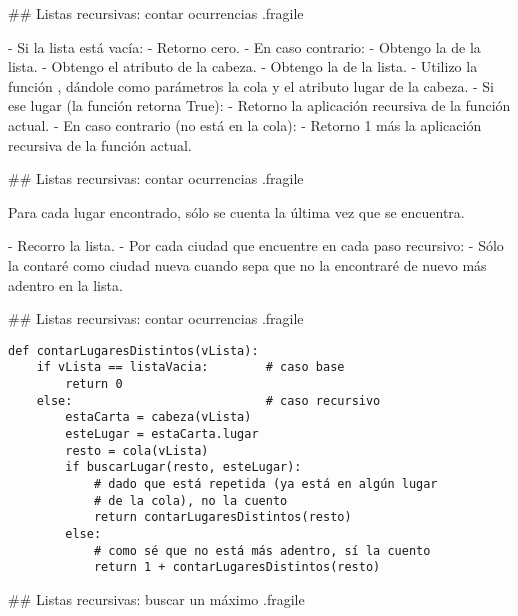 ## Listas recursivas: contar ocurrencias {.fragile}


\vspace{1ex}

- Si la lista está vacía:
    - Retorno cero.
- En caso contrario:
    - Obtengo la  de la lista.
    - Obtengo el atributo  de la cabeza.
    - Obtengo la  de la lista.
    - Utilizo la función , dándole como parámetros la cola y el atributo lugar de la cabeza.
    - Si ese lugar  (la función retorna True):
        - Retorno la aplicación recursiva de la función actual.
    - En caso contrario (no está en la cola):
        - Retorno 1 más la aplicación recursiva de la función actual.

## Listas recursivas: contar ocurrencias {.fragile}


\bgnblockidea
Para cada lugar encontrado, sólo se cuenta la última vez que se encuentra.
\trmblockidea

- Recorro la lista.
- Por cada ciudad que encuentre en cada paso recursivo:
    - Sólo la contaré como ciudad nueva cuando sepa que no la encontraré de nuevo más adentro en la lista.

## Listas recursivas: contar ocurrencias {.fragile}


\begin{lstlisting}[style=frame02]
def contarLugaresDistintos(vLista):
    if vLista == listaVacia:        # caso base
        return 0
    else:                           # caso recursivo
        estaCarta = cabeza(vLista)
        esteLugar = estaCarta.lugar
        resto = cola(vLista)
        if buscarLugar(resto, esteLugar):
            # dado que está repetida (ya está en algún lugar
            # de la cola), no la cuento
            return contarLugaresDistintos(resto)
        else:
            # como sé que no está más adentro, sí la cuento
            return 1 + contarLugaresDistintos(resto)
\end{lstlisting}


## Listas recursivas: buscar un máximo {.fragile}


